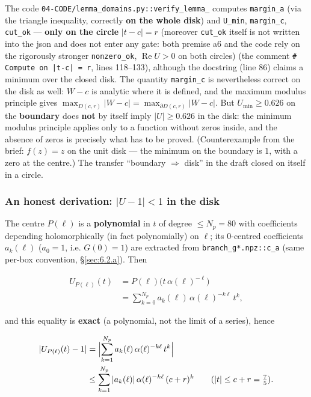 The code \texttt{04-\allowbreak CODE/\allowbreak lemma\_\allowbreak domains.py::\allowbreak verify\_\allowbreak lemma\_} computes
\texttt{margin\_a} (via the triangle inequality, correctly \textbf{on the
whole disk}) and \texttt{U\_min}, \texttt{margin\_c}, \texttt{cut\_ok} ---
\textbf{only on the circle} $|t-c|=r$ (moreover \texttt{cut\_ok} itself is not
written into the json and does not enter any gate: both premise a6 and the
code rely on the rigorously stronger \texttt{nonzero\_ok},
$\operatorname{Re}U>0$ on both circles) (the comment
\verb!# Compute on |t-c| = r!, lines 118--133), although the docstring (line
86) claims a minimum over the closed disk. The quantity \texttt{margin\_c} is
nevertheless correct on the disk as well: $W-c$ is analytic where it is
defined, and the maximum modulus principle gives
$\max_{D(c,r)}|W-c|=\max_{\partial D(c,r)}|W-c|$. But $U_{\min}\ge0.626$ on
the \textbf{boundary} does \textbf{not} by itself imply $|U|\ge0.626$ in the
disk: the minimum modulus principle applies only to a function without zeros
inside, and the absence of zeros is precisely what has to be proved.
(Counterexample from the brief: $f(z)=z$ on the unit disk --- the minimum on
the boundary is $1$, with a zero at the centre.) The transfer ``boundary
$\Rightarrow$ disk'' in the draft closed on itself in a circle.

\subsubsection{An honest derivation: $|U-1|<1$ in the disk}
\label{sec:6.4.2}

The centre $P(\ell)$ is a \textbf{polynomial} in $t$ of degree $\le N_p=80$
with coefficients depending holomorphically (in fact polynomially) on $\ell$;
its $0$-centred coefficients $a_k(\ell)$ ($a_0=1$, i.e. $G(0)=1$) are
extracted from \texttt{branch\_\allowbreak g*.npz::\allowbreak c\_\allowbreak a}
(same per-box convention, \S\ref{sec:6.2.a}). Then

\begin{align*}
U_{P(\ell)}(t)&=P(\ell)\bigl(t\,\alpha(\ell)^{-\ell}\bigr)\\
&=\sum_{k=0}^{N_p} a_k(\ell)\,\alpha(\ell)^{-k\ell}\,t^k,
\end{align*}

and this equality is \textbf{exact} (a polynomial, not the limit of a
series), hence

\begin{align*}
|U_{P(\ell)}(t)-1|
&=\Bigl|\sum_{k=1}^{N_p}a_k(\ell)\,\alpha(\ell)^{-k\ell}\,t^k\Bigr|\\
&\le\sum_{k=1}^{N_p}|a_k(\ell)|\,\alpha(\ell)^{-k\ell}\,(c+r)^k
\qquad(|t|\le c+r=\tfrac75).
\end{align*}

